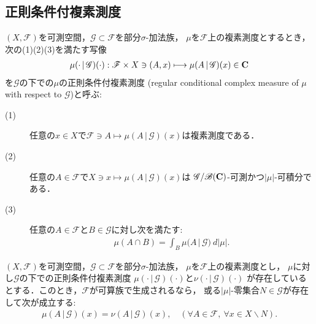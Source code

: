\subsection{正則条件付複素測度}
	\begin{screen}
		\begin{dfn}[正則条件付複素測度]
			$(X,\mathscr{F})$を可測空間，$\mathscr{G} \subset \mathscr{F}$を部分$\sigma$-加法族，
			$\mu$を$\mathscr{F}$上の複素測度とするとき，次の(1)(2)(3)を満たす写像
			\begin{align}
				\mu(\cdot\, |\, \mathscr{G})(\cdot):
				\mathscr{F} \times X \ni (A,x) \longmapsto \mu(A\, |\, \mathscr{G})(x) \in \mathbf{C}
			\end{align}
			を$\mathscr{G}$の下での$\mu$の正則条件付複素測度
			(regular conditional complex measure of $\mu$ with respect to $\mathscr{G}$)と呼ぶ:
			\begin{description}
				\item[(1)] 任意の$x \in X$で$\mathscr{F} \ni A \longmapsto \mu(A\, |\, \mathscr{G})(x)$は複素測度である．
				\item[(2)] 任意の$A \in \mathscr{F}$で$X \ni x \longmapsto \mu(A\, |\, \mathscr{G})(x)$は
					$\mathscr{G}/\mathscr{B}(\mathbf{C})$-可測かつ$|\mu|$-可積分である．
				\item[(3)] 任意の$A \in \mathscr{F}$と$B \in \mathscr{G}$に対し次を満たす:
					\begin{align}
						\mu(A \cap B) = \int_B \mu(A\, |\, \mathscr{G})\ d|\mu|.
					\end{align}
			\end{description}
		\end{dfn}
	\end{screen}
	
	\begin{screen}
		\begin{thm}[正則条件付複素測度の一意性]
			$(X,\mathscr{F})$を可測空間，$\mathscr{G} \subset \mathscr{F}$を部分$\sigma$-加法族，
			$\mu$を$\mathscr{F}$上の複素測度とし，
			$\mu$に対し$\mathscr{G}$の下での正則条件付複素測度
			$\mu(\cdot\, |\, \mathscr{G})(\cdot)$と$\nu(\cdot\, |\, \mathscr{G})(\cdot)$
			が存在しているとする．このとき，$\mathscr{F}$が可算族で生成されるなら，
			或る$|\mu|$-零集合$N \in \mathscr{G}$が存在して次が成立する:
			\begin{align}
				\mu(A\, |\, \mathscr{G})(x) = \nu(A\, |\, \mathscr{G})(x),
				\quad (\forall A \in \mathscr{F},\ \forall x \in X \backslash N).
			\end{align}
		\end{thm}
	\end{screen}
	
